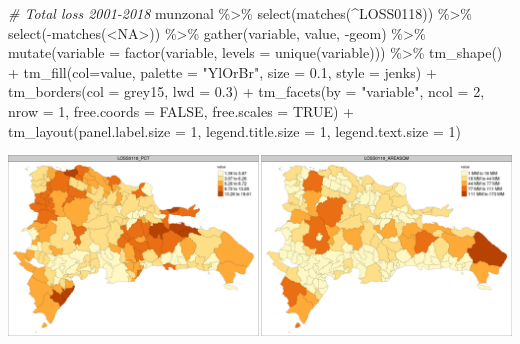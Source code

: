 \documentclass[10pt,landscape,a3paper]{article}
\newenvironment{Shaded}{\begin{snugshade}}{\end{snugshade}}
\newcommand{\AttributeTok}[1]{\textcolor[rgb]{0.77,0.63,0.00}{#1}}
\newcommand{\CommentTok}[1]{\textcolor[rgb]{0.56,0.35,0.01}{\textit{#1}}}
\newcommand{\ConstantTok}[1]{\textcolor[rgb]{0.00,0.00,0.00}{#1}}
\newcommand{\DecValTok}[1]{\textcolor[rgb]{0.00,0.00,0.81}{#1}}
\newcommand{\FloatTok}[1]{\textcolor[rgb]{0.00,0.00,0.81}{#1}}
\newcommand{\FunctionTok}[1]{\textcolor[rgb]{0.00,0.00,0.00}{#1}}
\newcommand{\NormalTok}[1]{#1}
\newcommand{\SpecialCharTok}[1]{\textcolor[rgb]{0.00,0.00,0.00}{#1}}
\newcommand{\StringTok}[1]{\textcolor[rgb]{0.31,0.60,0.02}{#1}}
\begin{document}
\begin{Shaded}
\begin{Highlighting}[]

\CommentTok{\# Total loss 2001{-}2018}
\NormalTok{munzonal }\SpecialCharTok{\%\textgreater{}\%} \FunctionTok{select}\NormalTok{(}\FunctionTok{matches}\NormalTok{(}\StringTok{\textquotesingle{}\^{}LOSS0118\textquotesingle{}}\NormalTok{)) }\SpecialCharTok{\%\textgreater{}\%} \FunctionTok{select}\NormalTok{(}\SpecialCharTok{{-}}\FunctionTok{matches}\NormalTok{(}\StringTok{\textquotesingle{}\textless{}NA\textgreater{}\textquotesingle{}}\NormalTok{)) }\SpecialCharTok{\%\textgreater{}\%} 
  \FunctionTok{gather}\NormalTok{(variable, value, }\SpecialCharTok{{-}}\NormalTok{geom) }\SpecialCharTok{\%\textgreater{}\%}
  \FunctionTok{mutate}\NormalTok{(}\AttributeTok{variable =} \FunctionTok{factor}\NormalTok{(variable, }\AttributeTok{levels =} \FunctionTok{unique}\NormalTok{(variable))) }\SpecialCharTok{\%\textgreater{}\%} 
  \FunctionTok{tm\_shape}\NormalTok{() }\SpecialCharTok{+}
  \FunctionTok{tm\_fill}\NormalTok{(}\AttributeTok{col=}\StringTok{\textquotesingle{}value\textquotesingle{}}\NormalTok{, }\AttributeTok{palette =} \StringTok{"YlOrBr"}\NormalTok{, }\AttributeTok{size =} \FloatTok{0.1}\NormalTok{, }\AttributeTok{style =} \StringTok{\textquotesingle{}jenks\textquotesingle{}}\NormalTok{) }\SpecialCharTok{+}
  \FunctionTok{tm\_borders}\NormalTok{(}\AttributeTok{col =} \StringTok{\textquotesingle{}grey15\textquotesingle{}}\NormalTok{, }\AttributeTok{lwd =} \FloatTok{0.3}\NormalTok{) }\SpecialCharTok{+}
  \FunctionTok{tm\_facets}\NormalTok{(}\AttributeTok{by =} \StringTok{"variable"}\NormalTok{, }\AttributeTok{ncol =} \DecValTok{2}\NormalTok{, }\AttributeTok{nrow =} \DecValTok{1}\NormalTok{, }\AttributeTok{free.coords =} \ConstantTok{FALSE}\NormalTok{, }\AttributeTok{free.scales =} \ConstantTok{TRUE}\NormalTok{) }\SpecialCharTok{+}
  \FunctionTok{tm\_layout}\NormalTok{(}\AttributeTok{panel.label.size =} \DecValTok{1}\NormalTok{, }\AttributeTok{legend.title.size =} \DecValTok{1}\NormalTok{, }\AttributeTok{legend.text.size =} \DecValTok{1}\NormalTok{)}
\end{Highlighting}
\end{Shaded}

\begin{center}\includegraphics{img/data-download-preparation-eda/zonal-mun-4} \end{center}
\end{document}
